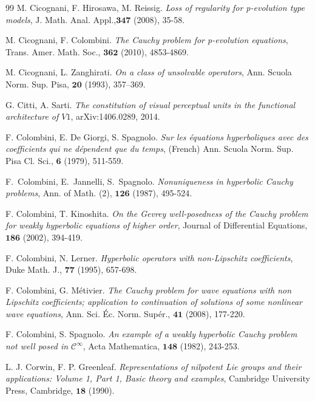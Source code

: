 \documentclass[12pt,oneside,a4paper]{book}
\numberwithin{equation}{section}     %
\theoremstyle{plain}
\theoremstyle{definition}
\begin{document}
\begin{thebibliography}{99}
	M. Cicognani, F. Hirosawa, M. Reissig. 
	\emph{Loss of regularity for p-evolution type models}, 
	J. Math. Anal. Appl.,$\mathbf{347}$ (2008), 35-58.
	
	M. Cicognani, F. Colombini.
	\emph{The Cauchy problem for p-evolution equations},
	Trans. Amer. Math. Soc., $\mathbf{362}$ (2010), 4853-4869.
	
	M. Cicognani, L. Zanghirati.
	\emph{On a class of unsolvable operators}, 
	Ann. Scuola Norm. Sup. Pisa, $\mathbf{20}$ (1993), 357–369.
	
	G. Citti, A. Sarti.
	\emph{The constitution of visual perceptual units in the functional architecture of $V1$},
	arXiv:1406.0289, 2014.
	
	F. Colombini, E. De Giorgi, S. Spagnolo.
	\emph{Sur les \'equations hyperboliques avec des coefficients qui ne d\'ependent que du temps},
	(French) Ann. Scuola Norm. Sup. Pisa Cl. Sci., $\mathbf 6$ (1979), 511-559. 
	
	F.~Colombini, E.~Jannelli, S.~Spagnolo.
	\emph{Nonuniqueness in hyperbolic {C}auchy problems},
	Ann. of Math. (2), $\mathbf{126}$ (1987), 495-524. 
	
	F. Colombini, T. Kinoshita.
	\emph{On the Gevrey well-posedness of the Cauchy problem for weakly hyperbolic equations of higher order}, Journal of Differential Equations, $\mathbf{186}$ (2002), 394-419.
	
	F. Colombini, N. Lerner.
	\emph{Hyperbolic operators with non-Lipschitz coefficients}, 
	Duke Math. J., $\mathbf{77}$ (1995), 657-698.
	
	F. Colombini, G. M\'etivier.
	\emph{The Cauchy problem for wave equations with non Lipschitz coefficients; application to continuation of solutions of some nonlinear wave equations}, 
	Ann. Sci. \'Ec. Norm. Sup\'er., $\mathbf{41}$ (2008), 177-220.
	
	
	F. Colombini, S. Spagnolo.
	\emph{An example of a weakly hyperbolic Cauchy problem not well posed in $\mathcal{C}^\infty$}, 
	Acta Mathematica, $\mathbf{148}$ (1982), 243-253.
	
	
	L. J. Corwin, F. P. Greenleaf.
	\emph{Representations of nilpotent Lie groups and their applications: Volume 1, Part 1, Basic theory and examples}, 
	Cambridge University Press, Cambridge, $\mathbf{18}$ (1990).
	

\end{thebibliography}
\end{document}
